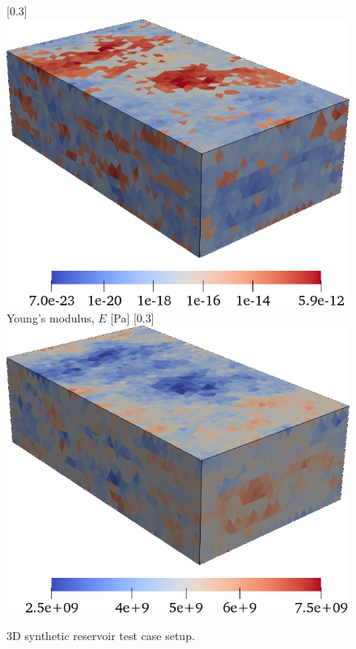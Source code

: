 \begin{figure} [htbp]
{    }
    [0.3\textwidth]
    {
        \includegraphics[width=\linewidth]{figs/MazuModel2/matlab/permz}
    }
    \hfill
    \subcaptionbox
    {
        Young's modulus, $E$ [\unit{Pa}]
        \label{fig:mazumodel2_matlab_setup_young}
    }
    [0.3\textwidth]
    {
        \includegraphics[width=\linewidth]{figs/MazuModel2/matlab/young}
    }
    \caption[3D synthetic reservoir test case setup]{3D synthetic reservoir test case setup.}
    \label{fig:mazumodel2_matlab_setup}
\end{figure}

